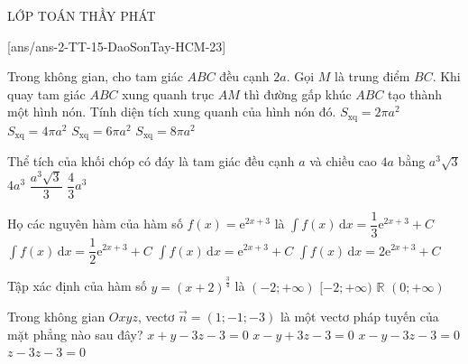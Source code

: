 \begin{name}
	{\tenchude}{\tendethi}{LỚP TOÁN THẦY PHÁT}{\thoigian}
\end{name}
\setcounter{ex}{0}\setcounter{bt}{0}
[ans/ans-2-TT-15-DaoSonTay-HCM-23]
\begin{ex}%
	Trong không gian, cho tam giác $ABC$ đều cạnh $2a$. Gọi $M$ là trung điểm $BC$. Khi quay tam giác $ABC$ xung quanh trục $AM$ thì đường gấp khúc $ABC$ tạo thành một hình nón. Tính diện tích xung quanh của hình nón đó.
	\choice
	{\True $S_{\text{xq}}=2\pi a^2$}
	{$S_{\text{xq}}=4\pi a^2$}
	{$S_{\text{xq}}=6\pi a^2$}
	{$S_{\text{xq}}=8\pi a^2$}
\end{ex}
\begin{ex}%
	Thể tích của khối chóp có đáy là tam giác đều cạnh $a$ và chiều cao $4a$ bằng
	\choice
	{$a^3\sqrt{3}$}
	{$4a^3$}
	{\True $\dfrac{a^3\sqrt{3}}{3}$}
	{$\dfrac{4}{3}a^3$}
\end{ex}
\begin{ex}%
	Họ các nguyên hàm của hàm số $f(x)=\mathrm{e}^{2x+3}$ là
	\choice
	{$\displaystyle\int f(x)\mathrm{\,d}x=\dfrac{1}{3}\mathrm{e}^{2x+3}+C$}
	{\True $\displaystyle\int f(x)\mathrm{\,d}x=\dfrac{1}{2}\mathrm{e}^{2x+3}+C$}
	{$\displaystyle\int f(x)\mathrm{\,d}x=\mathrm{e}^{2x+3}+C$}
	{$\displaystyle\int f(x)\mathrm{\,d}x=2\mathrm{e}^{2x+3}+C$}
\end{ex}
\begin{ex}%
	Tập xác định của hàm số $y=(x+2)^{\tfrac{3}{4}}$ là
	\choice
	{\True $(-2;+\infty)$}
	{$[-2;+\infty)$}
	{$\mathbb{R}$}
	{$(0;+\infty)$}
\end{ex}
\begin{ex}%
	Trong không gian $Oxyz$, vectơ $\vec{n}=(1;-1;-3)$ là một vectơ pháp tuyến của mặt phẳng nào sau đây?
	\choice
	{$x+y-3z-3=0$}
	{$x-y+3z-3=0$}
	{\True $x-y-3z-3=0$}
	{$z-3z-3=0$}
\end{ex}
